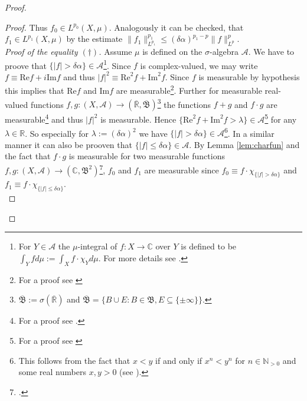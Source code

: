 \begin{proof}
\begin{proof}
Thus $f_0 \in L^{p_0}(X,\mu)$. Analogously it can be checked, that $f_1 \in L^{p_1}(X,\mu)$ by the estimate $\|f_1\|^{p_1}_{L^{p_1}} \leq (\delta\alpha)^{p_1 - p}\|f\|_{L^p}^p$.\\

	\emph{Proof of the equality $(\dagger)$.} Assume $\mu$ is defined on the $\sigma$-algebra $\mathcal{A}$. We have to proove that $\{\vert f \vert > \delta\alpha\} \in \mathcal{A}$\footnote{
		For $Y \in \mathcal{A}$ the $\mu$-integral of $f: X \rightarrow \mathbb{C}$ over $Y$ is defined to be $\displaystyle \int_Y fd\mu := \int_X f \cdot \chi_Y d\mu$. For more details see \cite[135--136]{elstrodt:mass:2011}.}.
		Since $f$ is complex-valued, we may write $f \equiv \mathrm{Re} f + i\mathrm{Im}f$ and thus $\vert f\vert^2 \equiv \mathrm{Re}^2 f + \mathrm{Im}^2f$. Since $f$ is measurable by hypothesis this implies that $ \mathrm{Re} f$ and $\mathrm{Im}f$ are measurable\footnote{For a proof see \cite[106]{elstrodt:mass:2011}}. Further for measurable real-valued functions $f,g: (X,\mathcal{A}) \rightarrow (\overline{\mathbb{R}},\overline{\mathfrak{B}})$\footnote{$\overline{\mathfrak{B}} := \sigma(\overline{\mathbb{R}})$ and $\overline{\mathfrak{B}} = \{B \cup E : B \in \mathfrak{B}, E \subseteq \{\pm \infty\}\}$.} 
		the functions $f + g$ and $f \cdot g$ are measurable\footnote{For a proof see \cite[107]{elstrodt:mass:2011}.}
		and thus $\vert f \vert^2$ is measurable. Hence $\{ \mathrm{Re}^2 f + \mathrm{Im}^2f > \lambda\} \in \mathcal{A}$\footnote{For a proof see \cite[105--106]{elstrodt:mass:2011}} for any $\lambda \in \mathbb{R}$. So especially for $\lambda := (\delta\alpha)^2$ we have $\{\vert f \vert > \delta\alpha\} \in \mathcal{A}$\footnote{This follows from the fact that $x < y$ if and only if $x^n < y^n$ for $n \in \mathbb{N}_{>0}$ and some real numbers $x,y > 0$ (see \cite[119]{zorich:analysis_I:2004}).}.
	In a similar manner it can also be prooven that $\{\vert f\vert \leq \delta \alpha\} \in \mathcal{A}$. By Lemma \ref{lem:charfun} and the fact that $f \cdot g$ is measurable for two measurable functions $f,g: (X,\mathcal{A}) \rightarrow (\mathbb{C},\mathfrak{B}^2)$\footcite[107]{elstrodt:mass:2011}, $f_0$ and $f_1$ are measurable since $f_0 \equiv f \cdot \chi_{\{\vert f \vert > \delta \alpha\}}$ and $f_1 \equiv f \cdot \chi_{\{\vert f \vert \leq \delta \alpha\}}$.\\


\end{proof}
\end{proof}
